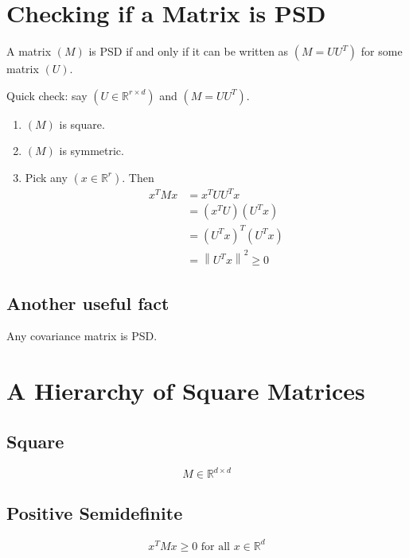 \documentclass{article}
\begin{document}
\section*{Checking if a Matrix is PSD}
A matrix $( M )$ is PSD if and only if it can be written as $( M = U U^{T} )$ for some matrix $( U )$.

Quick check: say $( U \in \mathbb{R}^{r \times d} )$ and $( M = U U^{T} )$.

\begin{enumerate}
    \item $( M )$ is square.
    \item $( M )$ is symmetric.
    \item Pick any $( x \in \mathbb{R}^{r} )$. Then
    \begin{equation}
    \begin{aligned}
    x^{T} M x & = x^{T} U U^{T} x \\
    & = \left(x^{T} U\right)\left(U^{T} x\right) \\
    & = \left(U^{T} x\right)^{T}\left(U^{T} x\right) \\
    & = \left\|U^{T} x\right\|^{2} \geq 0
    \end{aligned}
    \end{equation}
\end{enumerate}

\subsection*{Another useful fact}
Any covariance matrix is PSD.

\section*{A Hierarchy of Square Matrices}

\subsection*{Square}
\begin{equation}
M \in \mathbb{R}^{d \times d}
\end{equation}

\subsection*{Positive Semidefinite}
\begin{equation}
x^{T} M x \geq 0 \text{ for all } x \in \mathbb{R}^{d}
\end{equation}
\end{document}
